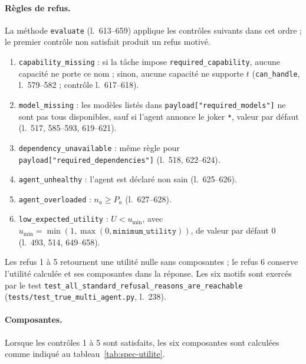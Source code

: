 \paragraph{Règles de refus.}
La méthode \texttt{evaluate} (l.~613--659) applique les contrôles suivants
dans cet ordre ; le premier contrôle non satisfait produit un refus motivé.
\begin{enumerate}
  \item \texttt{capability\_missing} : si la tâche impose
  \texttt{required\_capability}, aucune capacité ne porte ce nom ; sinon,
  aucune capacité ne supporte $t$ (\texttt{can\_handle}, l.~579--582 ;
  contrôle l.~617--618).
  \item \texttt{model\_missing} : les modèles listés dans
  \texttt{payload["required\_models"]} ne sont pas tous disponibles, sauf si
  l'agent annonce le joker \texttt{*}, valeur par défaut (l.~517, 585--593,
  619--621).
  \item \texttt{dependency\_unavailable} : même règle pour
  \texttt{payload["required\_dependencies"]} (l.~518, 622--624).
  \item \texttt{agent\_unhealthy} : l'agent est déclaré non sain
  (l.~625--626).
  \item \texttt{agent\_overloaded} : $n_a \geq P_a$ (l.~627--628).
  \item \texttt{low\_expected\_utility} : $U < u_{\min}$, avec
  $u_{\min} = \min(1, \max(0, \texttt{minimum\_utility}))$, de valeur par
  défaut $0$ (l.~493, 514, 649--658).
\end{enumerate}
Les refus 1 à 5 retournent une utilité nulle sans composantes ; le refus 6
conserve l'utilité calculée et ses composantes dans la réponse. Les six motifs
sont exercés par le test
\texttt{test\_all\_standard\_refusal\_reasons\_are\_reachable}
(\texttt{tests/test\_true\_multi\_agent.py}, l.~238).

\paragraph{Composantes.}
Lorsque les contrôles 1 à 5 sont satisfaits, les six composantes sont
calculées comme indiqué au tableau~\ref{tab:spec-utilite}.

